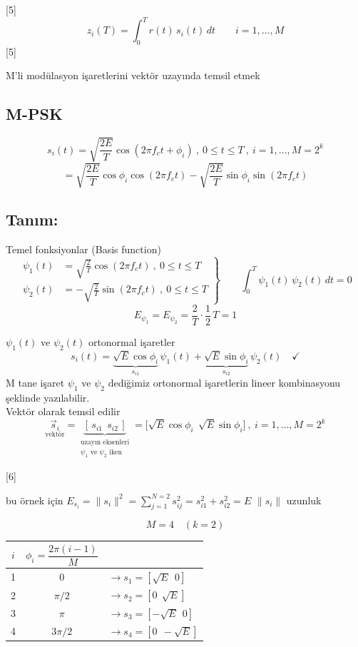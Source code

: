 \documentclass[11pt,a4paper]{article}
\begin{document}
[5]
\[ z_i(T)=\int_0^T r(t)\,s_i(t)\,dt\qquad i=1,\dots,M \]
[5]

M'li modülasyon işaretlerini vektör uzayında temsil etmek
\subsection{M-PSK}
\[ s_i(t)=\sqrt{\frac{2E}{T}}\cos(2\pi f_ct+\phi_i)\ ,\ 0\le t\le T\ ,\ i=1,\dots,M=2^k \]
\[ =\sqrt{\frac{2E}{T}}\cos\phi_i\cos(2\pi f_ct)-\sqrt{\frac{2E}{T}}\sin\phi_i\sin(2\pi f_ct) \]

\subsection{Tanım:}
Temel fonksiyonlar (Basis function)
\[ \left.\begin{aligned}
\psi_1(t)&=\sqrt{\tfrac{2}{T}}\cos(2\pi f_ct)\ ,\ 0\le t\le T\\
\psi_2(t)&=-\sqrt{\tfrac{2}{T}}\sin(2\pi f_ct)\ ,\ 0\le t\le T
\end{aligned}\right\}\qquad \int_0^T\psi_1(t)\,\psi_2(t)\,dt=0 \]
\[ E_{\psi_1}=E_{\psi_2}=\frac{2}{T}\cdot\frac{1}{2}\,T=1 \]

$\psi_1(t)$ ve $\psi_2(t)$ ortonormal işaretler
\[ s_i(t)=\underbrace{\sqrt{E}\cos\phi_i}_{s_{i1}}\,\psi_1(t)+\underbrace{\sqrt{E}\sin\phi_i}_{s_{i2}}\,\psi_2(t)\quad\checkmark \]
M tane işaret $\psi_1$ ve $\psi_2$ dediğimiz ortonormal işaretlerin lineer kombinasyonu şeklinde yazılabilir.\\
Vektör olarak temsil edilir
\[ \underset{\text{vektör}}{\vec{s}_i}=\underbrace{[\,s_{i1}\ \ s_{i2}\,]}_{\substack{\text{uzayın eksenleri}\\ \psi_1\text{ ve }\psi_2\text{ iken}}}=\bigl[\sqrt{E}\cos\phi_i\ \ \sqrt{E}\sin\phi_i\bigr]\ ,\ i=1,\dots,M=2^k \]

[6]

bu örnek için $E_{s_i}=\|s_i\|^2=\sum_{j=1}^{N=2}s_{ij}^2=s_{i1}^2+s_{i2}^2=E$ \qquad $\|s_i\|$ uzunluk

\[ M=4\quad(k=2) \]
\begin{center}
\begin{tabular}{c@{\qquad}c@{\qquad}l}
$i$ & $\phi_i=\dfrac{2\pi(i-1)}{M}$ & \\
\midrule
1 & $0$ & $\rightarrow s_1=[\sqrt{E}\ \ 0]$\\
2 & $\pi/2$ & $\rightarrow s_2=[0\ \ \sqrt{E}]$\\
3 & $\pi$ & $\rightarrow s_3=[-\sqrt{E}\ \ 0]$\\
4 & $3\pi/2$ & $\rightarrow s_4=[0\ \ -\sqrt{E}]$
\end{tabular}
\end{center}
\end{document}
